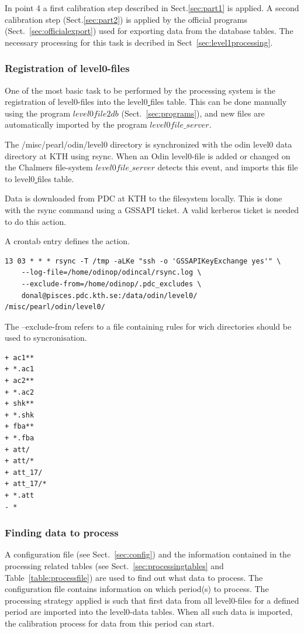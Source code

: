 \documentclass[12pt]{article}
\begin{document}
In point 4 a first calibration step described
in Sect.\ref{sec:part1} is applied.
A second calibration step (Sect.\ref{sec:part2}) is applied
by the official programs (Sect.~\ref{sec:officialexport})
used for exporting data from the database tables.
The necessary processing for this task is decribed 
in Sect~\ref{sec:level1processing}.




\subsubsection{Registration of level0-files}
\label{sec:registration}
One of the most basic task to be performed by the processing system is the
registration of level0-files into the level0\underline{ }files table.
This can be done manually using the program \(level0file2db\)
(Sect.~\ref{sec:programs}), and new files are automatically
imported by the program \(level0file\_server\).

The /misc/pearl/odin/level0 directory
is synchronized with the odin level0 data directory at KTH using rsync. 
When an Odin level0-file is added or changed on the Chalmers file-system
\(level0file\_server\)  detects this event, and imports this
file to level0\underline{ }files table.

Data is downloaded from PDC at KTH to the filesystem locally. This is done with the rsync command using a GSSAPI ticket. A valid kerberos ticket is needed to do this action.

A crontab entry defines the action.
\begin{verbatim}
13 03 * * * rsync -T /tmp -aLKe "ssh -o 'GSSAPIKeyExchange yes'" \
    --log-file=/home/odinop/odincal/rsync.log \
    --exclude-from=/home/odinop/.pdc_excludes \
    donal@pisces.pdc.kth.se:/data/odin/level0/ /misc/pearl/odin/level0/
\end{verbatim}

The --exclude-from refers to a file containing rules for wich directories should be used to syncronisation.

\begin{verbatim}
+ ac1**
+ *.ac1
+ ac2**
+ *.ac2
+ shk**
+ *.shk
+ fba**
+ *.fba
+ att/
+ att/*
+ att_17/
+ att_17/*
+ *.att
- *
\end{verbatim}



\subsubsection{Finding data to process}
\label{sec:findingdata}
A configuration file (see Sect.~\ref{sec:config})
and the information contained 
in the processing related tables (see Sect.~\ref{sec:processingtables}
and Table~\ref{table:processfile}) 
are used to find out what data to process. 
The configuration file contains information on which period(s)
to process. The processing strategy applied is such that
first data from all level0-files for a defined period
are imported into the level0-data tables.
When all such data is imported, the calibration process
for data from this period can start.
\end{document}
